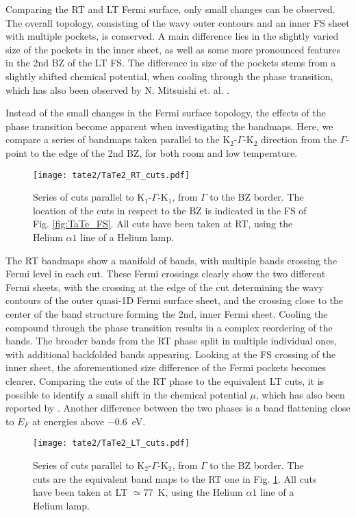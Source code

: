 Comparing the RT and LT Fermi surface, only small changes can be observed.
The overall topology, consisting of the wavy outer contours and an inner FS sheet with multiple pockets, is conserved.
A main difference lies in the slightly varied size of the pockets in the inner sheet, as well as some more pronounced features in the 2nd BZ of the LT FS.
The difference in size of the pockets stems from a slightly shifted chemical potential, when cooling through the phase transition, which has also been observed by N. Mitsuishi et. al. \cite{mitsuishi_unveiling_2024}.

Instead of the small changes in the Fermi surface topology, the effects of the phase transition become apparent when investigating the bandmaps.
Here, we compare a series of bandmaps taken parallel to the K$_2$-$\Gamma$-K$_2$ direction from the $\Gamma$-point to the edge of the 2nd BZ, for both room and low temperature.

\begin{figure}[t!]
	\centering
	\texttt{[image: tate2/TaTe2\_RT\_cuts.pdf]}
	\caption{Series of cuts parallel to K$_1$-$\Gamma$-K$_1$, from $\Gamma$ to the BZ border. The location of the cuts in respect to the BZ is indicated in the FS of Fig. \ref{fig:TaTe_FS}. All cuts have been taken at RT, using the Helium $\alpha1$ line of a Helium lamp.}
	\label{fig:TaTe_RT_cuts}
\end{figure}

The RT bandmaps show a manifold of bands, with multiple bands crossing the Fermi level in each cut.
These Fermi crossings clearly show the two different Fermi sheets, with the crossing at the edge of the cut determining the wavy contours of the outer quasi-1D Fermi surface sheet, and the crossing close to the center of the band structure forming the 2nd, inner Fermi sheet.
Cooling the compound through the phase transition results in a complex reordering of the bands.
The broader bands from the RT phase split in multiple individual ones, with additional backfolded bands appearing.
Looking at the FS crossing of the inner sheet, the aforementioned size difference of the Fermi pockets becomes clearer.
Comparing the cuts of the RT phase to the equivalent LT cuts, it is possible to identify a small shift in the chemical potential $\mu$, which has also been reported by \cite{mitsuishi_unveiling_2024}.
Another difference between the two phases is a band flattening close to $E_F$ at energies above \qty{-0.6}{\electronvolt}.

\begin{figure}[h]
	\centering
	\texttt{[image: tate2/TaTe2\_LT\_cuts.pdf]}
	\caption{Series of cuts parallel to K$_2$-$\Gamma$-K$_2$, from $\Gamma$ to the BZ border. The cuts are the equivalent band maps to the RT one in Fig. \ref{fig:TaTe_RT_cuts}. All cuts have been taken at LT $\simeq$\qty{77}{\kelvin}, using the Helium $\alpha1$ line of a Helium lamp.}
	\label{fig:TaTe_LT_cuts}
\end{figure}

